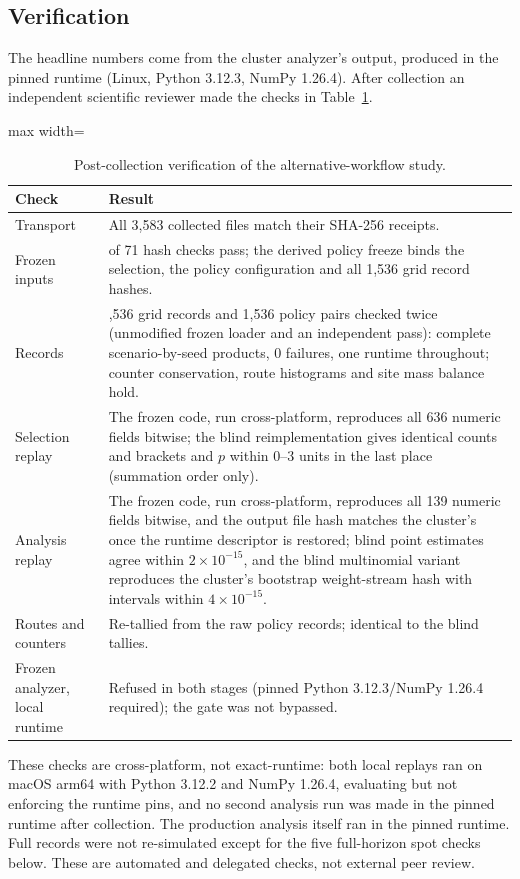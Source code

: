 \subsection{Verification}\label{sec:s-alt-verification}
The headline numbers come from the cluster analyzer's output, produced in the
pinned runtime (Linux, Python 3.12.3, NumPy 1.26.4). After collection an
independent scientific reviewer made the checks in Table~\ref{tab:alt-verif}.
\begin{table}[htbp]\centering\footnotesize
\caption{Post-collection verification of the alternative-workflow study.}\label{tab:alt-verif}
\begin{adjustbox}{max width=\linewidth}
\begin{tabular}{>{\raggedright\arraybackslash}p{.22\linewidth}>{\raggedright\arraybackslash}p{.70\linewidth}}\toprule
Check & Result\\\midrule
Transport & All 3,583 collected files match their SHA-256 receipts.\\
Frozen inputs & 71 of 71 hash checks pass; the derived policy freeze binds the selection, the policy configuration and all 1,536 grid record hashes.\\
Records & 1,536 grid records and 1,536 policy pairs checked twice (unmodified frozen loader and an independent pass): complete scenario-by-seed products, 0 failures, one runtime throughout; counter conservation, route histograms and site mass balance hold.\\
Selection replay & The frozen code, run cross-platform, reproduces all 636 numeric fields bitwise; the blind reimplementation gives identical counts and brackets and $p$ within 0--3 units in the last place (summation order only).\\
Analysis replay & The frozen code, run cross-platform, reproduces all 139 numeric fields bitwise, and the output file hash matches the cluster's once the runtime descriptor is restored; blind point estimates agree within $2\times10^{-15}$, and the blind multinomial variant reproduces the cluster's bootstrap weight-stream hash with intervals within $4\times10^{-15}$.\\
Routes and counters & Re-tallied from the raw policy records; identical to the blind tallies.\\
Frozen analyzer, local runtime & Refused in both stages (pinned Python 3.12.3/NumPy 1.26.4 required); the gate was not bypassed.\\
\bottomrule\end{tabular}
\end{adjustbox}
\end{table}
These checks are cross-platform, not exact-runtime: both local replays ran on
macOS arm64 with Python 3.12.2 and NumPy 1.26.4, evaluating but not enforcing the
runtime pins, and no second analysis run was made in the pinned runtime after
collection. The production analysis itself ran in the pinned runtime. Full
records were not re-simulated except for the five full-horizon spot checks
below. These are automated and delegated checks, not external peer review.

